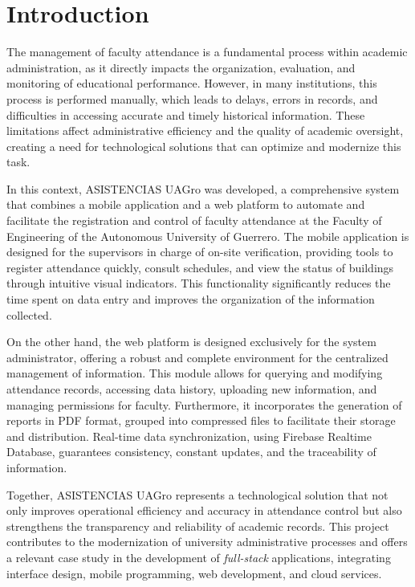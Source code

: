 \documentclass[journal=information,article,submit,pdftex,oneauthor]{Definitions/mdpi}
\begin{document}
	\section{Introduction}
	
	The management of faculty attendance is a fundamental process within academic administration, as it directly impacts the organization, evaluation, and monitoring of educational performance. However, in many institutions, this process is performed manually, which leads to delays, errors in records, and difficulties in accessing accurate and timely historical information. These limitations affect administrative efficiency and the quality of academic oversight, creating a need for technological solutions that can optimize and modernize this task.
	
	In this context, ASISTENCIAS UAGro was developed, a comprehensive system that combines a mobile application and a web platform to automate and facilitate the registration and control of faculty attendance at the Faculty of Engineering of the Autonomous University of Guerrero. The mobile application is designed for the supervisors in charge of on-site verification, providing tools to register attendance quickly, consult schedules, and view the status of buildings through intuitive visual indicators. This functionality significantly reduces the time spent on data entry and improves the organization of the information collected.
	
	On the other hand, the web platform is designed exclusively for the system administrator, offering a robust and complete environment for the centralized management of information. This module allows for querying and modifying attendance records, accessing data history, uploading new information, and managing permissions for faculty. Furthermore, it incorporates the generation of reports in PDF format, grouped into compressed files to facilitate their storage and distribution. Real-time data synchronization, using Firebase Realtime Database, guarantees consistency, constant updates, and the traceability of information.
	
	Together, ASISTENCIAS UAGro represents a technological solution that not only improves operational efficiency and accuracy in attendance control but also strengthens the transparency and reliability of academic records. This project contributes to the modernization of university administrative processes and offers a relevant case study in the development of \emph{full-stack} applications, integrating interface design, mobile programming, web development, and cloud services.
\end{document}
